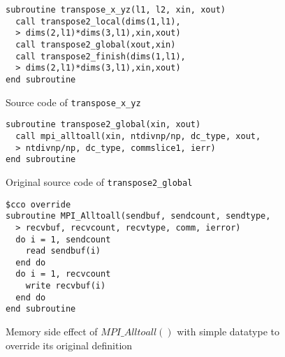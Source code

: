 \begin{figure}[h]
{\scriptsize
\begin{verbatim}
subroutine transpose_x_yz(l1, l2, xin, xout)
  call transpose2_local(dims(1,l1),
  > dims(2,l1)*dims(3,l1),xin,xout)
  call transpose2_global(xout,xin)
  call transpose2_finish(dims(1,l1),
  > dims(2,l1)*dims(3,l1),xin,xout)
end subroutine
\end{verbatim}
}
\caption{Source code of \texttt{transpose\_x\_yz}}
\label{fig:code:transpose}
\end{figure}

\begin{figure}[h]
{\scriptsize
\begin{verbatim}
subroutine transpose2_global(xin, xout)
  call mpi_alltoall(xin, ntdivnp/np, dc_type, xout,
  > ntdivnp/np, dc_type, commslice1, ierr)
end subroutine
\end{verbatim}
}
\caption{Original source code of \texttt{transpose2\_global}}
\label{fig:code:transpose2}
\end{figure}

\begin{figure}[h]
{\scriptsize
\begin{verbatim}
$cco override
subroutine MPI_Alltoall(sendbuf, sendcount, sendtype,
  > recvbuf, recvcount, recvtype, comm, ierror)
  do i = 1, sendcount
    read sendbuf(i)
  end do
  do i = 1, recvcount
    write recvbuf(i)
  end do
end subroutine
\end{verbatim}
}
\caption{Memory side effect of $MPI\_Alltoall()$ with simple datatype to override its original definition}
\label{fig:annot:a2a}
\end{figure}
